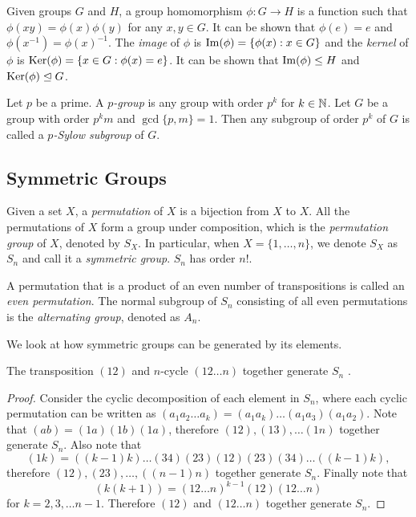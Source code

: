 \begin{definition}
	Given groups $G$ and $H$, a group homomorphism $\phi: G \to H$ is a function such that $\phi(xy) = \phi(x) \phi(y)$ for any $x, y \in G$. It can be shown that $\phi(e) = e$ and $\phi(x^{-1}) = \phi(x) ^ {-1}$. The \textit{image} of $\phi$ is $\operatorname{Im}(\phi) = \{\phi(x) : x\in G\}$ and the \textit{kernel} of $\phi$ is $\operatorname{Ker}(\phi) = \{x \in G : \phi(x) = e\}$. It can be shown that $\operatorname{Im}(\phi) \le H$ and $\operatorname{Ker}(\phi) \trianglelefteq G$.  
\end{definition}

\begin{definition}
	Let $p$ be a prime. A \textit{$p$-group} is any group with order $p^k$ for $k \in \mathbb N$. Let $G$ be a group with order $p^k m$ and $\gcd\{p, m\} = 1$. Then any subgroup of order $p^k$ of $G$ is called a \textit{$p$-Sylow subgroup} of $G$. 
\end{definition}

\subsection{Symmetric Groups}
\begin{definition}  \label{def:permutation}
	Given a set $X$, a \textit{permutation} of $X$ is a bijection from $X$ to $X$. All the permutations of $X$ form a group under composition, which is the \textit{permutation group} of $X$, denoted by $S_X$. In particular, when $X = \{1, \dots, n\}$, we denote $S_X$ as $S_n$ and call it a \textit{symmetric group}. $S_n$ has order $n!$. 
\end{definition}

\begin{definition}
	A permutation that is a product of an even number of transpositions is called an \textit{even permutation}. The normal subgroup of $S_n$ consisting of all even permutations is the \textit{alternating group}, denoted as $A_n$. 
\end{definition}

We look at how symmetric groups can be generated by its elements. 

\begin{theorem} \label{thm:symmetric-12-12n}
	The transposition $(12)$ and $n$-cycle $(12 \dots n)$ together generate $S_n$ . 
\end{theorem}
\begin{proof}
	Consider the cyclic decomposition of each element in $S_n$, where each cyclic permutation can be written as 
	$
	(a_1a_2\dots a_k) = (a_1 a_k) \dots (a_1 a_3) (a_1 a_2). 
	$
	Note that $(ab) = (1a)(1b)(1a)$, therefore $(12), (13), \ldots (1n)$ together generate $S_n$. Also note that  
	$$(1k)=((k-1)k)\dots(34)(23)(12)(23)(34)\dots((k-1)k),$$
	therefore $(12), (23), \dots, ((n-1)n)$ together generate $S_n$. Finally note that 
	$$
	(k(k+1)) = (12\dots n)^{k-1} (12) (12\dots n)
	$$
	for $k = 2, 3, \dots n - 1$. Therefore $(12)$ and $(12 \dots n)$ together generate $S_n$. 
\end{proof}

